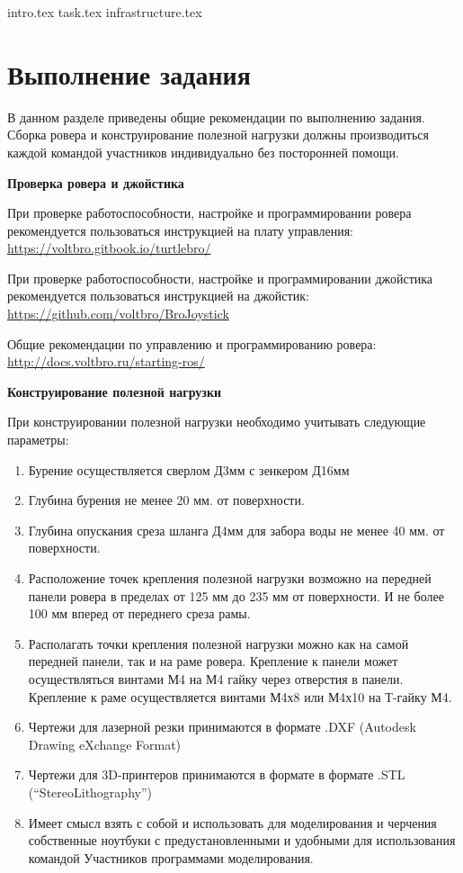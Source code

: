 {intro.tex}
{task.tex}
{infrastructure.tex}


\section{Выполнение задания}

В данном разделе приведены общие рекомендации по выполнению задания. Сборка ровера и конструирование полезной нагрузки должны производиться каждой командой участников индивидуально без посторонней помощи.

\textbf{Проверка ровера и джойстика}

При проверке работоспособности, настройке и программировании ровера рекомендуется пользоваться инструкцией на плату управления:
\url{https://voltbro.gitbook.io/turtlebro/}

При проверке работоспособности, настройке и программировании джойстика рекомендуется пользоваться инструкцией на джойстик:
\url{https://github.com/voltbro/BroJoystick}

Общие рекомендации по управлению и программированию ровера:
\url{http://docs.voltbro.ru/starting-ros/}


\textbf{Конструирование полезной нагрузки}

При конструировании полезной нагрузки необходимо учитывать следующие параметры:
\begin{enumerate}
    \item Бурение осуществляется сверлом Д3мм с зенкером Д16мм
    \item Глубина бурения не менее 20 мм. от поверхности.
    \item Глубина опускания среза шланга Д4мм для забора воды не менее 40 мм. от поверхности.
    \item Расположение точек крепления полезной нагрузки возможно на передней панели ровера в пределах от 125 мм до 235 мм от поверхности. И не более 100 мм вперед от переднего среза рамы.
    \item Располагать точки крепления полезной нагрузки можно как на самой передней панели, так и на раме ровера. Крепление к панели может осуществляться винтами М4 на М4 гайку через отверстия в панели. Крепление к раме осуществляется винтами М4х8 или М4х10 на Т-гайку М4.
    \item Чертежи для лазерной резки принимаются в формате .DXF (Autodesk Drawing eXchange Format)
    \item Чертежи для 3D-принтеров принимаются в формате в формате .STL (“StereoLithography”)
    \item Имеет смысл взять с собой и использовать для моделирования и черчения собственные ноутбуки с предустановленными и удобными для использования командой Участников программами моделирования.
\end{enumerate}

